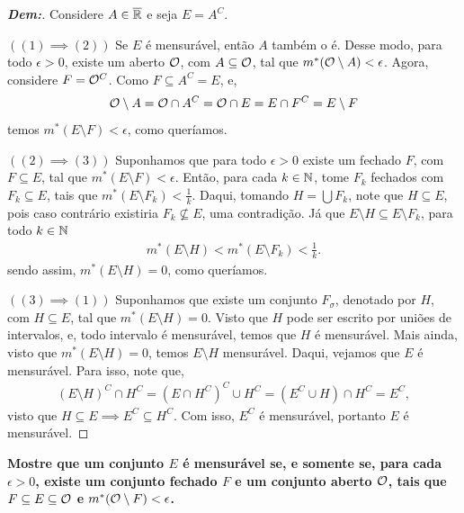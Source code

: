 \bigline
\begin{proof}[\textbf{Dem:}] Considere $A \in \overline {\mathbb R}$ e seja $E = A^C$. 

\noindent
  $((1) \implies (2))$ Se $E$ é mensurável, então $A$ também o é. Desse modo, 
  para todo $\epsilon > 0$, existe um aberto $\mathcal O$, com $A \subseteq \mathcal O$, 
  tal que $m^*(\mathcal O \setminus A) < \epsilon$. Agora, considere $F = \mathcal O^C$. 
  Como $F \subseteq A^C = E$, e, 
  \begin{align*}
    \mathcal O \setminus A = \mathcal O \cap A^C = \mathcal O \cap E = E\cap F^C = E\setminus F
  \end{align*}
  temos $m^*(E\setminus F) < \epsilon$, como queríamos.

  \noindent
  $((2) \implies (3))$ Suponhamos que para todo $\epsilon > 0$ existe um fechado $F$,
  com $F \subseteq E$, tal que $m^*(E\setminus F) < \epsilon$. Então, para cada $k \in \mathbb N$,
  tome $F_k$ fechados com $F_k \subseteq E$, tais que $m^*(E\setminus F_k)< 
  \frac{1}{k}$. Daqui, tomando $H = \bigcup F_k$, note que $H \subseteq E$, pois caso contrário
  existiria $F_k \not \subseteq E$, uma contradição. Já que $E\setminus H 
  \subseteq E\setminus F_k$, para todo $k \in \mathbb N$
  \begin{align*}
    m^*(E\setminus H) < m^*(E\setminus F_k) < \frac{1}{k}. 
  \end{align*}
  sendo assim, $m^*(E\setminus H) = 0$, como queríamos.
  
  \noindent
  $((3) \implies (1))$ Suponhamos que existe um conjunto $F_\sigma$, denotado 
  por $H$, com $H \subseteq E$, tal que $m^*(E\setminus H) = 0$. Visto que $H$ pode 
  ser escrito por uniões de intervalos, e, todo intervalo é mensurável, temos 
  que $H$ é mensurável. Mais ainda, visto que $m^*(E \setminus H) = 0$, 
  temos $E\setminus H$ mensurável. Daqui, vejamos que $E$ é mensurável. Para isso, 
  note que, 
  \begin{align*}
    (E\setminus H)^C\cap H^C = (E \cap H^C)^C \cup H^C = (E^C \cup H) \cap H^C
    = E^C,
  \end{align*}
  visto que $H\subseteq E \implies E^C \subseteq H^C$. Com isso, $E^C$ é mensurável,
  portanto $E$ é mensurável.
\end{proof}
\biglinend
\newpage
{}
\myexe{\thedois}
\bigline 
\textbf{Mostre que um conjunto $E$ é mensurável se, e somente se, para cada $\epsilon > 0$, 
existe um conjunto fechado $F$ e um conjunto aberto $\mathcal O$, tais que 
$F \subseteq E \subseteq \mathcal O$ e $m^*(\mathcal O\setminus F) < \epsilon$.}
